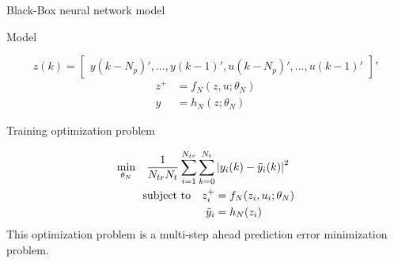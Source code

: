 \documentclass[xcolor=dvipsnames, 8pt]{beamer} %
\begin{document}
\begin{frame}{Black-Box neural network model}

	\begin{block}{Model}
	
	\begin{equation*}
		z(k) = \begin{bmatrix} y(k-N_p)', ..., y(k-1)',
							   u(k-N_p)', ..., u(k-1)' 
			   \end{bmatrix}'
	\end{equation*}
	\begin{align*}
		z^+ &= f_N(z, u;\theta_N) \\ 
		y &= h_N(z;\theta_N)
	\end{align*}
	\end{block}
	\pause
	\begin{block}{Training optimization problem}
		
	\begin{align*}
		\underset{\theta_N}{\textnormal{min}} \quad \dfrac{1}{N_{tr} 
		N_t} \sum_{i=1}^{N_{tr}}
		\sum_{k=0}^{N_t} & \left| y_i(k) - \tilde{y}_i(k) \right|^2 \\ 
		\textnormal{subject to} \quad z_i^+ & = f_N(z_i, u_i;\theta_N) \\
								  \tilde{y}_i &= h_N(z_i)
	\end{align*}
	This optimization problem is a multi-step ahead prediction error 
	minimization problem.	
	\end{block}

\end{frame}
\end{document}
